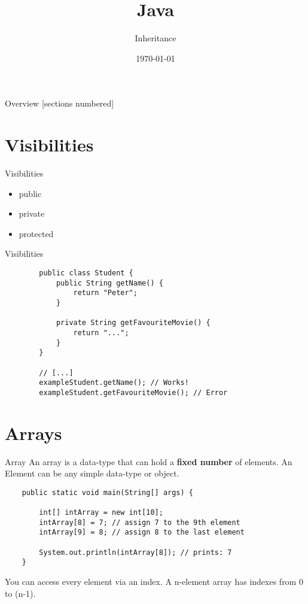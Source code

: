 


\title{Java}
\subtitle{Inheritance}
\date{\today}



\begin{frame}
    \titlepage
\end{frame}
\begin{frame}{Overview}
    [sections numbered]
    \tableofcontents
\end{frame}

\section{Visibilities}
\begin{frame}[fragile]{Visibilities}
    \begin{itemize}
        \item public
        \item private
        \item protected
    \end{itemize}
\end{frame}
    
\begin{frame}[fragile]{Visibilities}

    \begin{lstlisting}    
        public class Student {
            public String getName() {
                return "Peter";
            }
            
            private String getFavouriteMovie() {
                return "...";
            }
        }
    
        // [...]
        exampleStudent.getName(); // Works!
        exampleStudent.getFavouriteMovie(); // Error \end{lstlisting}
    
\end{frame}


\section{Arrays}
\begin{frame}[fragile]{Array}
    An array is a data-type that can hold a \textbf{fixed number} of elements. 
    An Element can be any simple data-type or object.
    \begin{lstlisting}
    public static void main(String[] args) {
    
        int[] intArray = new int[10];
        intArray[8] = 7; // assign 7 to the 9th element
        intArray[9] = 8; // assign 8 to the last element
        
        System.out.println(intArray[8]); // prints: 7
    } \end{lstlisting}
    You can access every element via an index. A n-element array has indexes from 0 to (n-1).
\end{frame}

